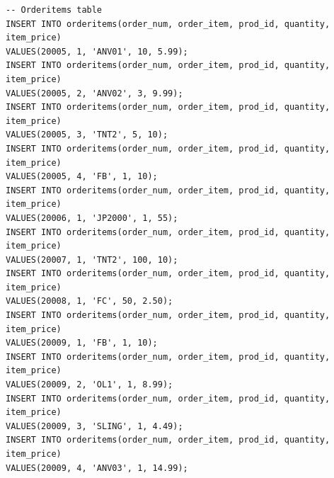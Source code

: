 \begin{enumerate}
\begin{center}
\begin{verbatim}
-- Orderitems table
INSERT INTO orderitems(order_num, order_item, prod_id, quantity, item_price)
VALUES(20005, 1, 'ANV01', 10, 5.99);
INSERT INTO orderitems(order_num, order_item, prod_id, quantity, item_price)
VALUES(20005, 2, 'ANV02', 3, 9.99);
INSERT INTO orderitems(order_num, order_item, prod_id, quantity, item_price)
VALUES(20005, 3, 'TNT2', 5, 10);
INSERT INTO orderitems(order_num, order_item, prod_id, quantity, item_price)
VALUES(20005, 4, 'FB', 1, 10);
INSERT INTO orderitems(order_num, order_item, prod_id, quantity, item_price)
VALUES(20006, 1, 'JP2000', 1, 55);
INSERT INTO orderitems(order_num, order_item, prod_id, quantity, item_price)
VALUES(20007, 1, 'TNT2', 100, 10);
INSERT INTO orderitems(order_num, order_item, prod_id, quantity, item_price)
VALUES(20008, 1, 'FC', 50, 2.50);
INSERT INTO orderitems(order_num, order_item, prod_id, quantity, item_price)
VALUES(20009, 1, 'FB', 1, 10);
INSERT INTO orderitems(order_num, order_item, prod_id, quantity, item_price)
VALUES(20009, 2, 'OL1', 1, 8.99);
INSERT INTO orderitems(order_num, order_item, prod_id, quantity, item_price)
VALUES(20009, 3, 'SLING', 1, 4.49);
INSERT INTO orderitems(order_num, order_item, prod_id, quantity, item_price)
VALUES(20009, 4, 'ANV03', 1, 14.99);


\end{verbatim}
\end{center}
\end{enumerate}
